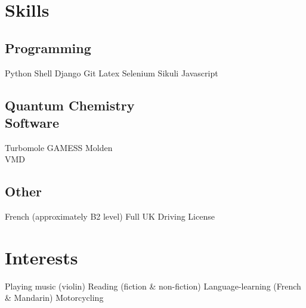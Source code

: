 \documentclass[letterpaper]{deedy-resume} %
\begin{document}
\begin{minipage}[t]{0.33\textwidth}
\sectionspace %


\section{Skills}

\subsection{Programming}

Python \textbullet{} Shell \textbullet{} Django \textbullet{} Git \textbullet{} Latex \textbullet{} Selenium \textbullet{} Sikuli \textbullet{} Javascript

\sectionspace %

\subsection[]{Quantum Chemistry \\ Software}

Turbomole \textbullet{} GAMESS \textbullet{} Molden \\
\textbullet{} VMD 

\sectionspace %

\subsection[]{Other}

French (approximately B2 level) \textbullet{} Full UK Driving License

\sectionspace %

\section{Interests}

Playing music (violin) \textbullet{} Reading (fiction \& non-fiction) \textbullet{} Language-learning (French \& Mandarin) \textbullet{} Motorcycling \\


\end{minipage} %
\end{document}

